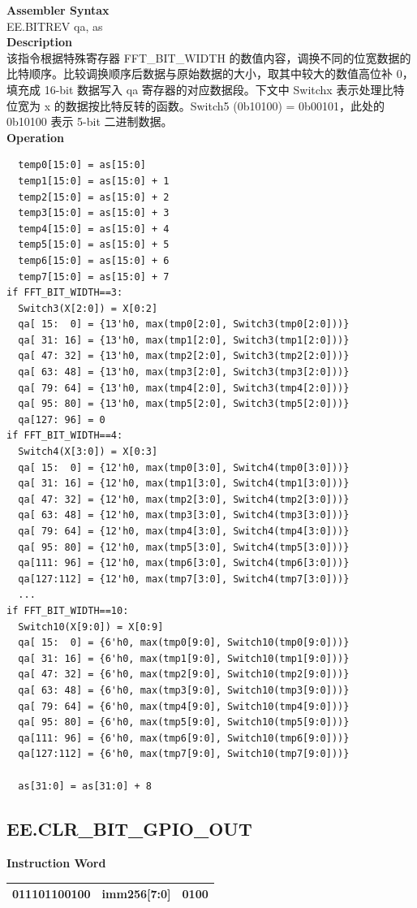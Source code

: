 \textbf{Assembler Syntax} \\
EE.BITREV qa, as \\
\textbf{Description} \\
该指令根据特殊寄存器 FFT\_BIT\_WIDTH 的数值内容，调换不同的位宽数据的比特顺序。比较调换顺序后数据与原始数据的大小，取其中较大的数值高位补 0，填充成 16-bit 数据写入 qa 寄存器的对应数据段。下文中 Switchx 表示处理比特位宽为 x 的数据按比特反转的函数。Switch5 (0b10100) = 0b00101，此处的 0b10100 表示 5-bit 二进制数据。\\
\textbf{Operation}
\begin{lstlisting}
  temp0[15:0] = as[15:0]
  temp1[15:0] = as[15:0] + 1
  temp2[15:0] = as[15:0] + 2
  temp3[15:0] = as[15:0] + 3
  temp4[15:0] = as[15:0] + 4
  temp5[15:0] = as[15:0] + 5
  temp6[15:0] = as[15:0] + 6
  temp7[15:0] = as[15:0] + 7
if FFT_BIT_WIDTH==3:
  Switch3(X[2:0]) = X[0:2]
  qa[ 15:  0] = {13'h0, max(tmp0[2:0], Switch3(tmp0[2:0]))}
  qa[ 31: 16] = {13'h0, max(tmp1[2:0], Switch3(tmp1[2:0]))}
  qa[ 47: 32] = {13'h0, max(tmp2[2:0], Switch3(tmp2[2:0]))}
  qa[ 63: 48] = {13'h0, max(tmp3[2:0], Switch3(tmp3[2:0]))}
  qa[ 79: 64] = {13'h0, max(tmp4[2:0], Switch3(tmp4[2:0]))}
  qa[ 95: 80] = {13'h0, max(tmp5[2:0], Switch3(tmp5[2:0]))}
  qa[127: 96] = 0
if FFT_BIT_WIDTH==4:
  Switch4(X[3:0]) = X[0:3]
  qa[ 15:  0] = {12'h0, max(tmp0[3:0], Switch4(tmp0[3:0]))}
  qa[ 31: 16] = {12'h0, max(tmp1[3:0], Switch4(tmp1[3:0]))}
  qa[ 47: 32] = {12'h0, max(tmp2[3:0], Switch4(tmp2[3:0]))}
  qa[ 63: 48] = {12'h0, max(tmp3[3:0], Switch4(tmp3[3:0]))}
  qa[ 79: 64] = {12'h0, max(tmp4[3:0], Switch4(tmp4[3:0]))}
  qa[ 95: 80] = {12'h0, max(tmp5[3:0], Switch4(tmp5[3:0]))}
  qa[111: 96] = {12'h0, max(tmp6[3:0], Switch4(tmp6[3:0]))}
  qa[127:112] = {12'h0, max(tmp7[3:0], Switch4(tmp7[3:0]))}
  ...
if FFT_BIT_WIDTH==10:
  Switch10(X[9:0]) = X[0:9]
  qa[ 15:  0] = {6'h0, max(tmp0[9:0], Switch10(tmp0[9:0]))}
  qa[ 31: 16] = {6'h0, max(tmp1[9:0], Switch10(tmp1[9:0]))}
  qa[ 47: 32] = {6'h0, max(tmp2[9:0], Switch10(tmp2[9:0]))}
  qa[ 63: 48] = {6'h0, max(tmp3[9:0], Switch10(tmp3[9:0]))}
  qa[ 79: 64] = {6'h0, max(tmp4[9:0], Switch10(tmp4[9:0]))}
  qa[ 95: 80] = {6'h0, max(tmp5[9:0], Switch10(tmp5[9:0]))}
  qa[111: 96] = {6'h0, max(tmp6[9:0], Switch10(tmp6[9:0]))}
  qa[127:112] = {6'h0, max(tmp7[9:0], Switch10(tmp7[9:0]))}

  as[31:0] = as[31:0] + 8
\end{lstlisting}

\clearpage
\subsection{EE.CLR\_BIT\_GPIO\_OUT}\label{instruction:EECLRBITGPIOOUT}
\setlength\tabcolsep{6pt}
\textbf{Instruction Word} \\
\begin{tabular}{|c|c|c|}
	\hline
	011101100100 & imm256[7:0] & 0100 \\
	\hline
\end{tabular}

